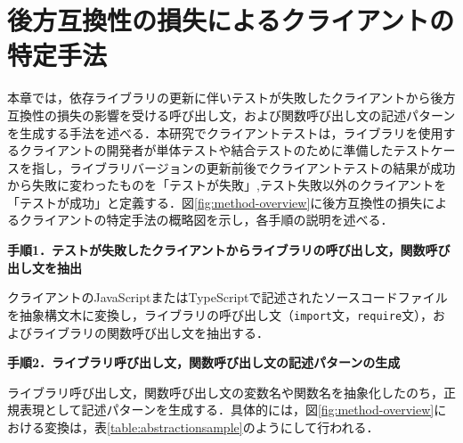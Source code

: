 \documentclass[T,J]{fose} %
\begin{document}
\section{後方互換性の損失によるクライアントの特定手法}\label{sec:method}

本章では，依存ライブラリの更新に伴いテストが失敗したクライアントから後方互換性の損失の影響を受ける呼び出し文，および関数呼び出し文の記述パターンを生成する手法を述べる．本研究でクライアントテストは，ライブラリを使用するクライアントの開発者が単体テストや結合テストのために準備したテストケースを指し，ライブラリバージョンの更新前後でクライアントテストの結果が成功から失敗に変わったものを「テストが失敗」,テスト失敗以外のクライアントを「テストが成功」と定義する．図\ref{fig:method-overview}に後方互換性の損失によるクライアントの特定手法の概略図を示し，各手順の説明を述べる．



\noindent\textbf{手順1．テストが失敗したクライアントからライブラリの呼び出し文，関数呼び出し文を抽出}

クライアントのJavaScriptまたはTypeScriptで記述されたソースコードファイルを抽象構文木に変換し，ライブラリの呼び出し文（\texttt{import}文，\texttt{require}文），およびライブラリの関数呼び出し文を抽出する．

\noindent\textbf{手順2．ライブラリ呼び出し文，関数呼び出し文の記述パターンの生成}

ライブラリ呼び出し文，関数呼び出し文の変数名や関数名を抽象化したのち，正規表現として記述パターンを生成する．具体的には，図\ref{fig:method-overview}における変換は，表\ref{table:abstractionsample}のようにして行われる．
\end{document}
